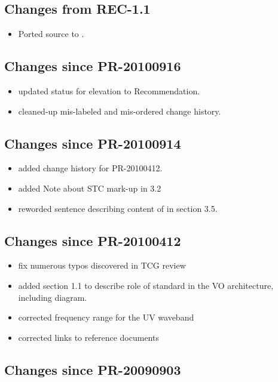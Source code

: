 \documentclass[11pt,a4paper]{ivoa}
\begin{document}
\subsection{Changes from REC-1.1}

\begin{itemize}
\item Ported source to \ivoatex.
\end{itemize}

\subsection{Changes since PR-20100916}

\begin{itemize}
  \item updated status for elevation to Recommendation.
  \item cleaned-up mis-labeled and mis-ordered change history.
\end{itemize}

\subsection{Changes since PR-20100914}

\begin{itemize}
  \item added change history for PR-20100412.
  \item added Note about STC mark-up in 3.2
  \item reworded sentence describing content of  in
       section 3.5.
\end{itemize}

\subsection{Changes since PR-20100412}

\begin{itemize}
  \item fix numerous typos discovered in TCG review
  \item added section 1.1 to describe role of standard in the VO
       architecture, including diagram.
  \item corrected frequency range for the UV waveband
  \item corrected links to reference documents
\end{itemize}

\subsection{Changes since PR-20090903}
\end{document}
